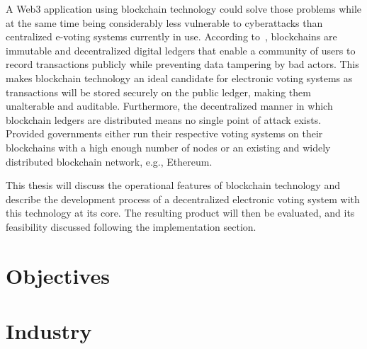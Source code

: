 A \Gls{Web3} application using blockchain technology could solve those problems while at the same time being considerably less vulnerable to cyberattacks than centralized e-voting systems currently in use.
According to~\textcite{yaga_blockchain_2018}, blockchains are immutable and decentralized digital ledgers that enable a community of users to record transactions publicly while preventing data tampering by bad actors.
This makes blockchain technology an ideal candidate for electronic voting systems as transactions will be stored securely on the public ledger, making them unalterable and auditable.
Furthermore, the decentralized manner in which blockchain ledgers are distributed means no single point of attack exists.
Provided governments either run their respective voting systems on their blockchains with a high enough number of nodes or an existing and widely distributed blockchain network, e.g., Ethereum.

This thesis will discuss the operational features of blockchain technology and describe the development process of a decentralized electronic voting system with this technology at its core.
The resulting product will then be evaluated, and its feasibility discussed following the implementation section.

\section{Objectives}\label{sec:objectives}

\section{Industry}\label{sec:industry}


